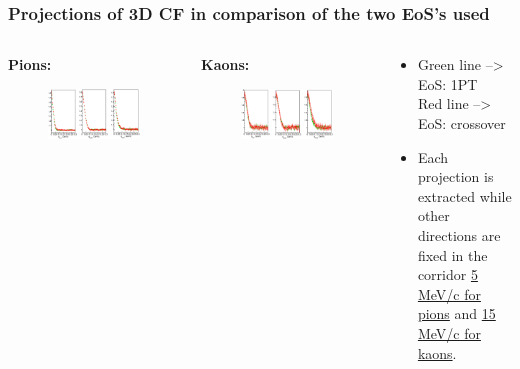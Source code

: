 \documentclass[dvipsnames] {beamer}
\begin{document}
%
\begin{frame}[shrink=50]
\frametitle{{\small \bf \centering Projections of 3D CF in comparison of the two EoS's used}}
  \bf 
  \begin{columns}
  \begin{block}{\bf \centering Pions:}
  	\begin{figure}[H]
  	 \includegraphics[width=.95\textwidth]{pions_1PT_crossover_comparison.eps}
    \end{figure}	
  \end{block}
  \begin{block}{\bf \centering Kaons:}
  	\begin{figure}[H]
      \includegraphics[width=.95\textwidth]{kaons_1PT_crossover_comparison.eps}
    \end{figure}
  \end{block}
\begin{block}{}
\begin{itemize}
\item {\color{LimeGreen} Green line} --> EoS: 1PT \\
{\color{red} Red line} --> EoS: crossover
\item Each projection is extracted while other directions are fixed in the corridor \underline {5 MeV/c for pions} and \underline {15 MeV/c for kaons}.	
\end{itemize}
\end{block}


\end{columns}
\end{frame}
\end{document}
